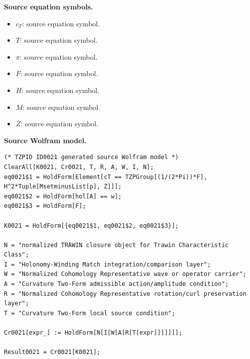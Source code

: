 \begin{minipage}[t]{0.49\linewidth}
\begingroup
\small
\raggedright
\textbf{Source equation symbols.}\par
\begin{itemize}[leftmargin=1.35em,itemsep=1pt,topsep=1pt,parsep=0pt]
    \item $c_{T}$: source equation symbol.
    \item $T$: source equation symbol.
    \item $\pi$: source equation symbol.
    \item $F$: source equation symbol.
    \item $H$: source equation symbol.
    \item $M$: source equation symbol.
    \item $Z$: source equation symbol.
\end{itemize}
\endgroup
\end{minipage}\hfill
\begin{minipage}[t]{0.47\linewidth}
\begingroup
\scriptsize
\raggedright
\textbf{Source Wolfram model.}\par
\begin{Verbatim}[fontsize=\tiny,breaklines=true,breakanywhere=true]
(* TZPID ID0021 generated source Wolfram model *)
ClearAll[K0021, Cr0021, T, R, A, W, I, N];
eq0021$1 = HoldForm[Element[cT == TZPGroup[(1/(2*Pi))*F], H^2*Tuple[MsetminusList[p], Z]]];
eq0021$2 = HoldForm[hol[A] == w];
eq0021$3 = HoldForm[F];

K0021 = HoldForm[{eq0021$1, eq0021$2, eq0021$3}];

N = "normalized TRAWIN closure object for Trawin Characteristic Class";
I = "Holonomy-Winding Match integration/comparison layer";
W = "Normalized Cohomology Representative wave or operator carrier";
A = "Curvature Two-Form admissible action/amplitude condition";
R = "Normalized Cohomology Representative rotation/curl preservation layer";
T = "Curvature Two-Form local source condition";

Cr0021[expr_] := HoldForm[N[I[W[A[R[T[expr]]]]]]];

Result0021 = Cr0021[K0021];
\end{Verbatim}
\endgroup
\end{minipage}

